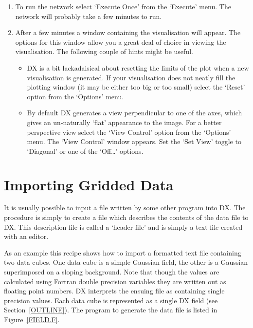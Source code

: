 \begin{enumerate}
  \item To run the network select `Execute Once' from the `Execute'
   menu.  The network will probably take a few minutes to run.

  \item After a few minutes a window containing the visualisation will
   appear. The options for this window allow you a great deal of choice
   in viewing the visualisation. The following couple of hints might be
   useful.

  \begin{itemize}

    \item DX is a bit lackadaisical about resetting the limits of the
     plot when a new visualisation is generated. If your visualisation
     does not neatly fill the plotting window (it may be either too big
     or too small) select the `Reset' option from the `Options' menu.

    \item By default DX generates a view perpendicular to one of the 
     axes, which gives an un-naturally `flat' appearance to the image.
     For a better perspective view select the `View Control' option
     from the `Options' menu. The `View Control' window appears. Set the
     `Set View' toggle to `Diagonal' or one of the `Off\ldots' options.

  \end{itemize}

\end{enumerate}


\newpage
\section{\label{IMP_GRID}Importing Gridded Data}


It is usually possible to input a file written by some other program
into DX. The procedure is simply to create a file which describes the
contents of the data file to DX. This description file is called a
`header file' and is simply a text file created with an editor.

As an example this recipe shows how to import a formatted text file
containing two data cubes. One data cube is a simple Gaussian field,
the other is a Gaussian superimposed on a sloping background. Note that
though the values are calculated using Fortran double precision
variables they are written out as floating point numbers. DX interprets the
ensuing file as containing single precision values. Each data cube is
represented as a single DX field (see Section~\ref{OUTLINE}).
The program to generate the data file is listed in Figure~\ref{FIELD.F}.

